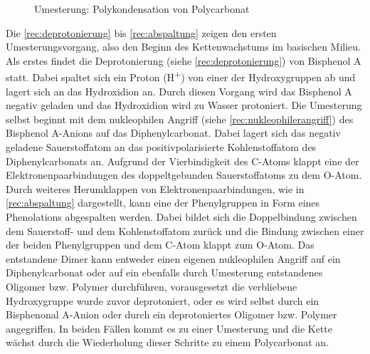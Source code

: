 \begin{figure}[H]
    \begin{center}
        \footnotesize
        \setatomsep{1.7em}


        \vspace{10pt}

        \chemrel{->}

        \caption{Umesterung: Polykondensation von Polycarbonat}
        \label{rec:polycarbonat}
    \end{center}
\end{figure}

Die \autoref{rec:deprotonierung} bis \autoref{rec:abspaltung} zeigen den ersten
Umesterungsvorgang, also den Beginn des Kettenwachstums im basischen Milieu. Als
erstes findet die Deprotonierung (siehe \autoref{rec:deprotonierung}) von
Bisphenol A statt. Dabei spaltet sich ein Proton (H\textsuperscript{+}) von
einer der Hydroxygruppen ab und lagert sich an das Hydroxidion an. Durch diesen
Vorgang wird das Bisphenol A negativ geladen und das Hydroxidion wird zu Wasser
protoniert. Die Umesterung selbst beginnt mit dem nukleophilen Angriff (siehe
\autoref{rec:nukleophilerangriff}) des Bisphenol A-Anions auf das
Diphenylcarbonat. Dabei lagert sich das negativ geladene Sauerstoffatom an das
positivpolarisierte Kohlenstoffatom des Diphenylcarbonats an. Aufgrund der
Vierbindigkeit des C-Atoms \glqq klappt\grqq{} eine der Elektronenpaarbindungen
des doppeltgebunden Sauerstoffatoms zu dem O-Atom. Durch weiteres \glqq
Herumklappen\grqq{} von Elektronenpaarbindungen, wie in \autoref{rec:abspaltung}
dargestellt, kann eine der Phenylgruppen in Form eines Phenolations abgespalten
werden. Dabei bildet sich die Doppelbindung zwischen dem Sauerstoff- und dem
Kohlenstoffatom zurück und die Bindung zwischen einer der beiden Phenylgruppen
und dem C-Atom \glqq klappt\grqq{} zum O-Atom. Das entstandene Dimer kann
entweder einen eigenen nukleophilen Angriff auf ein Diphenylcarbonat oder auf
ein ebenfalls durch Umesterung entstandenes Oligomer bzw. Polymer durchführen,
vorausgesetzt die verbliebene Hydroxygruppe wurde zuvor deprotoniert, oder es
wird selbst durch ein Bisphenonal A-Anion oder durch ein deprotoniertes Oligomer
bzw. Polymer angegriffen. In beiden Fällen kommt es zu einer Umesterung und die
Kette wächst durch die Wiederholung dieser Schritte zu einem Polycarbonat an.

